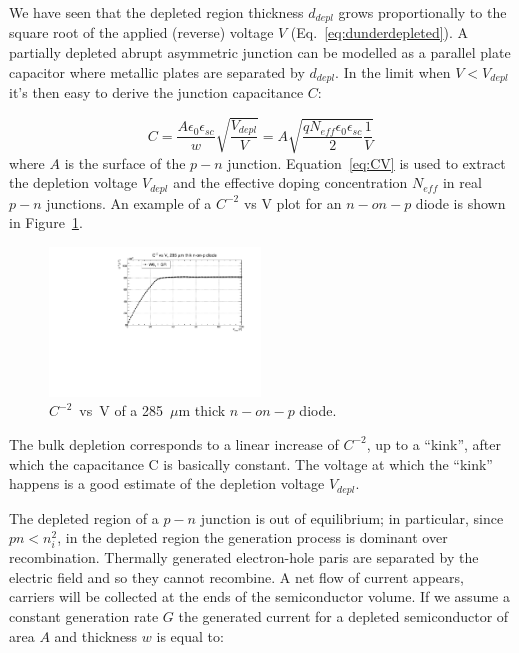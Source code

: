  We have seen that the depleted region thickness $d_{depl}$ grows proportionally to the square root of 
 the applied (reverse) voltage $V$ (Eq.~\ref{eq:dunderdepleted}). A partially depleted 
 abrupt asymmetric junction can be modelled as  a parallel plate capacitor where 
 metallic plates are separated by $d_{depl}$. In the limit when $V<V_{depl}$
 it's then easy to derive the junction capacitance $C$:
 
 \begin{equation}
 C=\dfrac{A\epsilon_0\epsilon_{sc}}{w}\sqrt{\dfrac{V_{depl}}{V}}=A\sqrt{\dfrac{qN_{eff}\epsilon_0\epsilon_{sc}}{2}\dfrac{1}{V}}
 \label{eq:CV}
 \end{equation}
 where $A$ is the surface of the $p-n$ junction. Equation~\ref{eq:CV} is used to extract the 
 depletion voltage $V_{depl}$ and the effective doping concentration $N_{eff}$ in real 
 $p-n$ junctions. An example of a  $C^{-2}$ vs V plot for an $n-on-p$ diode is shown  in 
 Figure~\ref{fig:CV}. 
    
  
\begin{figure}[!htbp]
\centering
\includegraphics[width=0.5\textwidth]{C2V-n-in-p-291920-6-1GRs-GR1atGND-110704.pdf}
\caption{\label{fig:CV} $C^{-2}$~vs~V of a 285~$\mu$m thick $n-on-p$ diode.}
\end{figure}  
  
The bulk depletion corresponds to a linear increase of   $C^{-2}$, up to a ``kink'', after which the 
capacitance C is basically constant. The voltage at which the ``kink'' happens is a good estimate 
of the depletion voltage $V_{depl}$.
  
The depleted region of a $p-n$ junction is out of equilibrium; in particular, since $pn<n_i^2$, in the 
depleted region  the generation process is dominant over recombination. Thermally generated 
electron-hole paris are separated by the electric field and so they cannot recombine. A net 
flow of current appears, carriers will be collected at the ends of the semiconductor volume. 
If we assume a constant generation rate $G$ the generated current for a depleted semiconductor 
of area $A$ and thickness $w$ is equal to:

